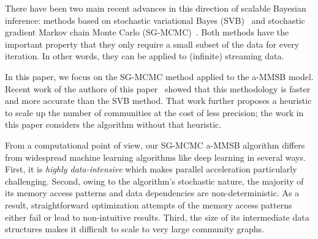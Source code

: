 There have been two main recent advances in this direction of scalable Bayesian inference: methods based on stochastic variational Bayes (SVB)~\cite{gopalan2012scalable,hoffman2013stochastic,gopalan2013efficient} and stochastic gradient Markov chain Monte Carlo (SG-MCMC)~\cite{welling2011bayesian,patterson2013stochastic,ahn2014distributed,ahn2012bayesian}. Both methods have the important property that they only require a small subset of the data for every iteration. In other words, they can be applied to (infinite) streaming data.

In this paper, we focus on the SG-MCMC method applied to the a-MMSB model. Recent
work of the authors of this paper~\cite{LiAW15} showed that this methodology is faster and more accurate than the
SVB method. That work further proposes a heuristic to scale up the number of
communities at the cost of less precision; the work in this paper considers the
algorithm without that heuristic.

From a computational point of view, our SG-MCMC a-MMSB algorithm differs
from widespread machine learning algorithms like deep learning in several
ways. First, it is \emph{highly data-intensive} which makes parallel acceleration
particularly challenging. Second, owing to the algorithm's stochastic
nature, the majority of its memory access patterns and data dependencies
are non-deterministic. As a result, straightforward optimization attempts
of the memory access patterns either fail or lead to non-intuitive results. Third,
the size of its intermediate data structures makes it difficult to scale to very large
community graphs.


